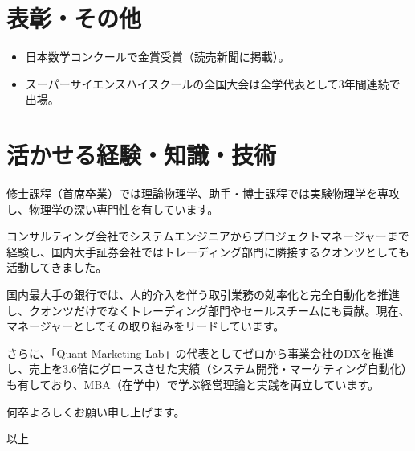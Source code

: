 \documentclass[uplatex,a4j,10.5pt,dvipdfmx]{jsarticle}
\begin{document}
\newpage

\section{表彰・その他}
\begin{itemize}[leftmargin=*]
	\item 日本数学コンクールで金賞受賞（読売新聞に掲載）。
	\item スーパーサイエンスハイスクールの全国大会は全学代表として3年間連続で出場。
\end{itemize}

\section{活かせる経験・知識・技術}

修士課程（首席卒業）では理論物理学、助手・博士課程では実験物理学を専攻し、物理学の深い専門性を有しています。

コンサルティング会社でシステムエンジニアからプロジェクトマネージャーまで経験し、国内大手証券会社ではトレーディング部門に隣接するクオンツとしても活動してきました。

国内最大手の銀行では、人的介入を伴う取引業務の効率化と完全自動化を推進し、クオンツだけでなくトレーディング部門やセールスチームにも貢献。現在、マネージャーとしてその取り組みをリードしています。

さらに、「Quant Marketing Lab」の代表としてゼロから事業会社のDXを推進し、売上を3.6倍にグロースさせた実績（システム開発・マーケティング自動化）も有しており、MBA（在学中）で学ぶ経営理論と実践を両立しています。

\vspace{1\baselineskip}
何卒よろしくお願い申し上げます。

\vspace{1\baselineskip}
\hfill 以上
\end{document}
